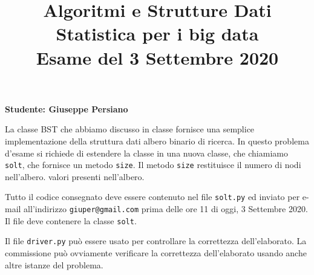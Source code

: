 \documentclass{amsart}
\begin{document}
\title{Algoritmi e Strutture Dati\\
Statistica per i big data\\
Esame del 3 Settembre 2020
}


\newcommand{\NomeStudente}{Giuseppe Persiano}
\newcommand{\nomeClasse}{solt}


\maketitle

\hfill{{\bf Studente: \NomeStudente}}

\smallskip
La classe BST che abbiamo discusso in classe fornisce una semplice 
implementazione della struttura dati albero binario di ricerca.
In questo problema d'esame si richiede di estendere la classe {}
in una nuova classe, che chiamiamo {\tt {\nomeClasse}},
che fornisce un metodo 
{\tt size}. Il metodo {\tt size} restituisce il numero di nodi nell'albero.
valori presenti nell'albero.


\medskip{}
Tutto il codice consegnato deve essere contenuto nel file
{\tt \nomeClasse .py} ed inviato per e-mail all'indirizzo
{\tt giuper@gmail.com} prima delle ore 11 di oggi, 3 Settembre 2020.
Il file deve contenere la classe {\tt \nomeClasse}.

Il file {\tt driver.py} pu\`o essere usato per controllare la correttezza
dell'elaborato. 
La commissione pu\`o ovviamente verificare la correttezza dell'elaborato
usando anche altre istanze del problema.
\end{document}
